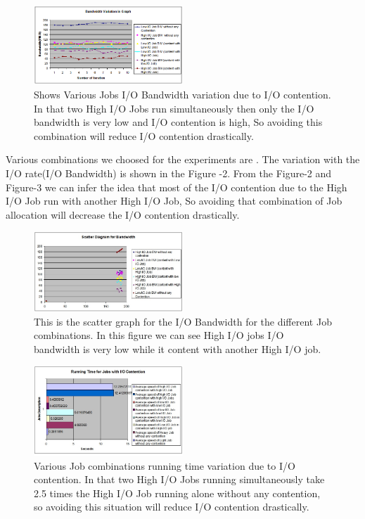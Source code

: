 \documentclass{article}
\begin{document}
\newline 
\begin{figure}
  \centering    
      \includegraphics[width=0.5\textwidth]{BandwidthVariationinLine.png}
  \caption{Shows Various Jobs I/O Bandwidth variation due to I/O contention. In that two High I/O Jobs run simultaneously then only the I/O bandwidth is very low and I/O contention is high, So avoiding this combination will reduce I/O contention drastically.}
\end{figure}
Various combinations we choosed for the experiments are . The variation with the I/O rate(I/O Bandwidth) is shown in the Figure -2. From the Figure-2 and Figure-3 we can infer the idea that most of the I/O contention due to the High I/O Job run with another High I/O Job, So avoiding that combination of Job allocation will decrease the I/O contention drastically. 
\newline
\begin{figure}
  \centering    
      \includegraphics[width=0.5\textwidth]{ScatterDiagram.jpg}
  \caption{This is the scatter graph for the I/O Bandwidth for the different Job combinations. In this figure we can see High I/O jobs I/O bandwidth is very low while it content with another High I/O job.}
\end{figure}
\begin{figure}
  \centering    
      \includegraphics[width=0.5\textwidth]{RunningTime-I-O-Contention.jpg}
  \caption{Various Job combinations running time variation due to I/O contention. In that two High I/O Jobs running simultaneously take 2.5 times the High I/O Job running alone without any contention, so avoiding this situation will reduce I/O contention drastically.}
\end{figure} 
\end{document}
